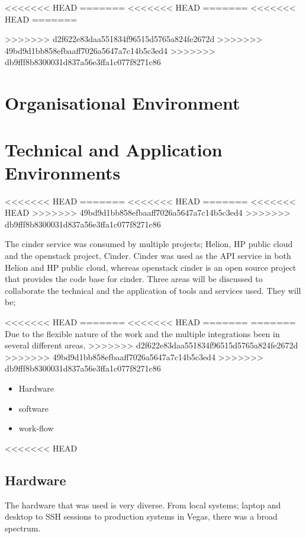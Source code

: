 \documentclass[11pt,a4paper]{report}
\begin{document}
<<<<<<< HEAD
\tableofcontents
\newpage
=======
<<<<<<< HEAD
\tableofcontents
\newpage
=======
<<<<<<< HEAD
\tableofcontents
\newpage
=======

>>>>>>> d2f622e83daa551834f96515d5765a824fe2672d
>>>>>>> 49bd9d1bb858efbaaff7026a5647a7c14b5c3ed4
>>>>>>> db9fff8b8300031d837a56e3ffa1c077f8271c86
\section{Organisational Environment}
 


\section{Technical and Application Environments}
<<<<<<< HEAD
=======
<<<<<<< HEAD
=======
<<<<<<< HEAD
>>>>>>> 49bd9d1bb858efbaaff7026a5647a7c14b5c3ed4
>>>>>>> db9fff8b8300031d837a56e3ffa1c077f8271c86


The cinder service was consumed by multiple projects; Helion, HP public cloud and the openstack project, Cinder. Cinder was used as the API service in both Helion and HP public cloud, whereas openstack cinder is an open source project that provides the code base for cinder. Three areas will be discussed to collaborate the technical and the application of tools and services used. They will be;

<<<<<<< HEAD
=======
<<<<<<< HEAD
=======
=======
Due to the flexible nature of the work and the multiple integrations  been in several different areas, 
>>>>>>> d2f622e83daa551834f96515d5765a824fe2672d
>>>>>>> 49bd9d1bb858efbaaff7026a5647a7c14b5c3ed4
>>>>>>> db9fff8b8300031d837a56e3ffa1c077f8271c86
\begin{itemize}
\item Hardware
\item software
\item work-flow
\end{itemize} 

<<<<<<< HEAD
\subsection{Hardware}
The hardware that was used is very diverse. From local systems; laptop and desktop to SSH sessions to production systems in Vegas, there was a broad spectrum.\\
\end{document}
